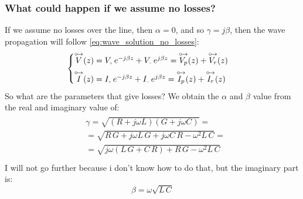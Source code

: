 \subsubsection*{What could happen if we assume no losses?}
If we assume no losses over the line, then $\alpha=0$, and so $\gamma = j\beta$, then the wave propagation will follow \cref{eq:wave_solution_no_losses}:
\begin{equation}
  \begin{cases}
  \phas{V}(z)=V\bottomPlus \,e^{-j\beta z}+V\bottomMinus \,e^{j\beta z}=\phas{V_p}(z)+\phas{V_r}(z)\\[5pt]
  \phas{I}(z)=I\bottomPlus \,e^{-j\beta z}+I\bottomMinus \,e^{j\beta z}=\phas{I_p}(z)+\phas{I_r}(z)
  \end{cases}\label{eq:wave_solution_no_losses}
\end{equation}
So what are the parameters that give losses? We obtain the $\alpha$ and $\beta$ value from the real and imaginary value of:
\begin{align}
  \begin{split}
    &\gamma =\sqrt{(R+j\omega L)(G+j\omega C)}=\\[5pt]
    &=\sqrt{R\,G+j\omega L\,G+j\omega C\,R-\omega^2L\,C}=\\[5pt]
    &=\sqrt{j\omega( L\,G + C\,R)+R\,G-\omega^2L\,C}\\[5pt]
  \end{split}
\end{align}
I will not go further because i don't know how to do that, but the imaginary part is:
\begin{equation}
  \beta=\omega\sqrt{L\,C}
\end{equation}